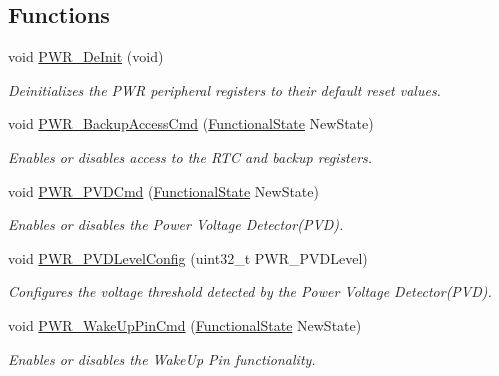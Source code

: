 \subsection*{Functions}
\begin{DoxyCompactItemize}
\item 
void \hyperlink{group___p_w_r___private___functions_gad03a0aac7bc3bc3a9fd012f3769a6990}{P\+W\+R\+\_\+\+De\+Init} (void)
\begin{DoxyCompactList}\small\item\em Deinitializes the P\+WR peripheral registers to their default reset values. \end{DoxyCompactList}\item 
void \hyperlink{group___p_w_r___private___functions_ga0741aea35572b1a75f82b74de12df800}{P\+W\+R\+\_\+\+Backup\+Access\+Cmd} (\hyperlink{group___exported__types_gac9a7e9a35d2513ec15c3b537aaa4fba1}{Functional\+State} New\+State)
\begin{DoxyCompactList}\small\item\em Enables or disables access to the R\+TC and backup registers. \end{DoxyCompactList}\item 
void \hyperlink{group___p_w_r___private___functions_ga42cad476b816e0a33594a933b3ed1acd}{P\+W\+R\+\_\+\+P\+V\+D\+Cmd} (\hyperlink{group___exported__types_gac9a7e9a35d2513ec15c3b537aaa4fba1}{Functional\+State} New\+State)
\begin{DoxyCompactList}\small\item\em Enables or disables the Power Voltage Detector(\+P\+V\+D). \end{DoxyCompactList}\item 
void \hyperlink{group___p_w_r___private___functions_ga237c143ef6aa55abb8049fa7bf24ab8f}{P\+W\+R\+\_\+\+P\+V\+D\+Level\+Config} (uint32\+\_\+t P\+W\+R\+\_\+\+P\+V\+D\+Level)
\begin{DoxyCompactList}\small\item\em Configures the voltage threshold detected by the Power Voltage Detector(\+P\+V\+D). \end{DoxyCompactList}\item 
void \hyperlink{group___p_w_r___private___functions_gae5fd6f9336ef8c60d5483651cb0d1a00}{P\+W\+R\+\_\+\+Wake\+Up\+Pin\+Cmd} (\hyperlink{group___exported__types_gac9a7e9a35d2513ec15c3b537aaa4fba1}{Functional\+State} New\+State)
\begin{DoxyCompactList}\small\item\em Enables or disables the Wake\+Up Pin functionality. \end{DoxyCompactList}\item 

\end{DoxyCompactItemize}
